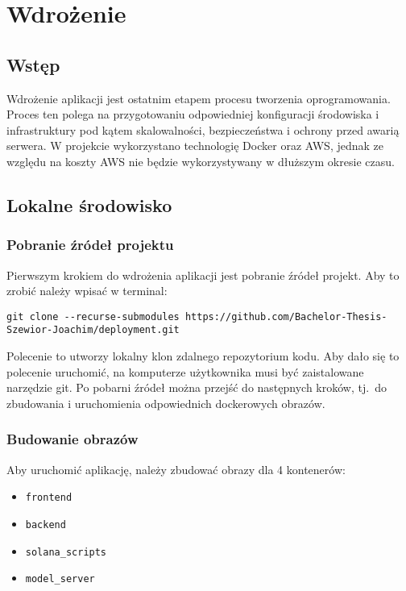 \chapter{Wdrożenie}
\section{Wstęp}
Wdrożenie aplikacji jest ostatnim etapem procesu tworzenia oprogramowania. Proces ten polega na przygotowaniu odpowiedniej konfiguracji środowiska i infrastruktury pod kątem skalowalności, bezpieczeństwa i ochrony przed awarią serwera. W projekcie wykorzystano technologię Docker oraz AWS, jednak ze względu na koszty AWS nie będzie wykorzystywany w dłuższym okresie czasu.

\section{Lokalne środowisko}
\subsection{Pobranie źródeł projektu}
Pierwszym krokiem do wdrożenia aplikacji jest pobranie źródeł projekt. Aby to zrobić należy wpisać w terminal:
\begin{lstlisting}[basicstyle=\ttfamily\footnotesite]
git clone --recurse-submodules https://github.com/Bachelor-Thesis-Szewior-Joachim/deployment.git
\end{lstlisting}
Polecenie to utworzy lokalny klon zdalnego repozytorium kodu. Aby dało się to polecenie uruchomić, na komputerze użytkownika musi być zaistalowane narzędzie git.
Po pobarni źródeł można przejść do następnych kroków, tj.\ do zbudowania i uruchomienia odpowiednich dockerowych obrazów.

\subsection{Budowanie obrazów}
Aby uruchomić aplikację, należy zbudować obrazy dla 4 kontenerów:
\begin{itemize}
    \item \texttt{frontend}
    \item \texttt{backend}
    \item \texttt{solana\_scripts}
    \item \texttt{model\_server}
\end{itemize}

